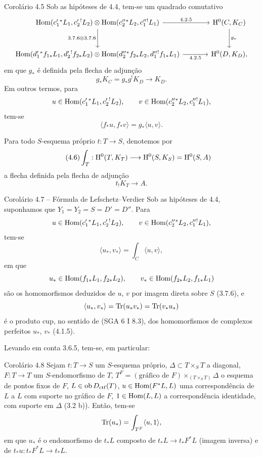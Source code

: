 \begin{statement}{Corolário 4.5}
Sob as hipóteses de 4.4, tem-se um quadrado comutativo
\[
\begin{tikzcd}[column sep=large,row sep=large]
\Hom(c_1'{}^*L_1,c_2'{}^!L_2)\otimes
\Hom(c_2''{}^*L_2,c_1''{}^!L_1)
 \arrow[r,"4.2.5"] \arrow[d,"3.7.6\otimes 3.7.6"'] &
\H^0(C,K_C)\arrow[d,"g_*"]\\
\Hom(d_1'{}^*f_{1*}L_1,d_2'{}^!f_{2*}L_2)\otimes
\Hom(d_2''{}^*f_{2*}L_2,d_1''{}^!f_{1*}L_1)
 \arrow[r,"4.2.5"'] &
\H^0(D,K_D),
\end{tikzcd}
\]
em que $g_*$ é definida pela flecha de adjunção
\[
g_*K_C=g_*g^!K_D\longrightarrow K_D.
\]
Em outros termos, para
\[
u\in\operatorname{Hom}(c_1'{}^*L_1,c_2'{}^!L_2),\qquad
v\in\operatorname{Hom}(c_2''{}^*L_2,c_1''{}^!L_1),
\]
tem-se
\begin{equation}
\tag{4.5.1}
\langle f_*u,f_*v\rangle=g_*\langle u,v\rangle.
\end{equation}
\end{statement}

Para todo $S$-esquema próprio $t:T\longrightarrow S$, denotemos por
\begin{equation}
\tag{4.6}
\int_T:\mathrm{H}^0(T,K_T)\longrightarrow \mathrm{H}^0(S,K_S)=\mathrm{H}^0(S,A)
\end{equation}
a flecha definida pela flecha de adjunção
\[
t_!K_T\longrightarrow A.
\]

\begin{statement}{Corolário 4.7 -- Fórmula de Lefschetz--Verdier}
Sob as hipóteses de 4.4, suponhamos que $Y_1=Y_2=S=D'=D''$. Para
\[
u\in\operatorname{Hom}(c_1'{}^*L_1,c_2'{}^!L_2),\qquad
v\in\operatorname{Hom}(c_2''{}^*L_2,c_1''{}^!L_1),
\]
tem-se
\begin{equation}
\tag{4.7.1}
\langle u_*,v_*\rangle=\int_C\langle u,v\rangle,
\end{equation}
em que
\[
u_*\in\operatorname{Hom}(f_{1*}L_1,f_{2*}L_2),\qquad
v_*\in\operatorname{Hom}(f_{2*}L_2,f_{1*}L_1)
\]
são os homomorfismos deduzidos de $u$, $v$ por imagem direta sobre $S$ (3.7.6), e
\[
\langle u_*,v_*\rangle=\operatorname{Tr}(u_*v_*)=\operatorname{Tr}(v_*u_*)
\]
é o produto cup, no sentido de (SGA 6 I 8.3), dos homomorfismos de complexos perfeitos $u_*$, $v_*$ (4.1.5).
\end{statement}

Levando em conta 3.6.5, tem-se, em particular:

\begin{statement}{Corolário 4.8}
Sejam $t:T\longrightarrow S$ um $S$-esquema próprio, $\Delta\subset T\times_S T$ a diagonal, $F:T\longrightarrow T$ um $S$-endomorfismo de $T$, $T^F=(\text{gráfico de }F)\times_{(T\times_S T)}\Delta$ o esquema de pontos fixos de $F$, $L\in\operatorname{ob}D_{\mathrm{ctf}}(T)$, $u\in\operatorname{Hom}(F^*L,L)$ uma correspondência de $L$ a $L$ com suporte no gráfico de $F$, $1\in\operatorname{Hom}(L,L)$ a correspondência identidade, com suporte em $\Delta$ (3.2 b)). Então, tem-se
\[
\operatorname{Tr}(u_*)=\int_{T^F}\langle u,1\rangle,
\]
em que $u_*$ é o endomorfismo de $t_*L$ composto de $t_*L\longrightarrow t_*F^*L$ (imagem inversa) e de $t_*u:t_*F^*L\longrightarrow t_*L$.
\end{statement}

